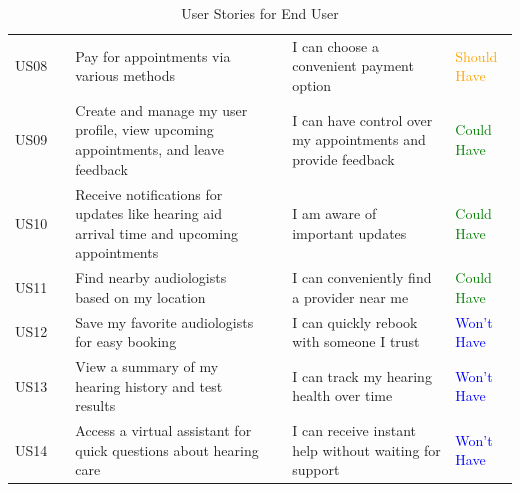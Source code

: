 \documentclass{article}
\begin{document}
\begin{table}[t]
\begin{tabular}{|c|c|C{4cm}|c|C{4cm}|C{2cm}|}
        US08       &                   & Pay for appointments via various methods      &                   &  I can choose a convenient payment option               & \textcolor{orange}{Should Have} \\   
        US09       &                   & Create and manage my user profile, view upcoming appointments, and leave feedback      &                   &  I can have control over my appointments and provide feedback               & \textcolor{green}{Could Have} \\   
        US10       &                   & Receive notifications for updates like hearing aid arrival time and upcoming appointments      &                   &   I am aware of important updates               & \textcolor{green}{Could Have} \\   
        US11       &                   & Find nearby audiologists based on my location      &                   &  I can conveniently find a provider near me               & \textcolor{green}{Could Have} \\   
        US12       &                   & Save my favorite audiologists for easy booking     &                   &  I can quickly rebook with someone I trust               & \textcolor{blue}{Won't Have} \\   
        US13       &                   & View a summary of my hearing history and test results     &                   &  I can track my hearing health over time               & \textcolor{blue}{Won't Have} \\   
        US14       &                   & Access a virtual assistant for quick questions about hearing care     &                   &  I can receive instant help without waiting for support               & \textcolor{blue}{Won't Have} \\ \hline
    \end{tabular}
    \caption{User Stories for End User}
\end{table}
\newpage
\end{document}
